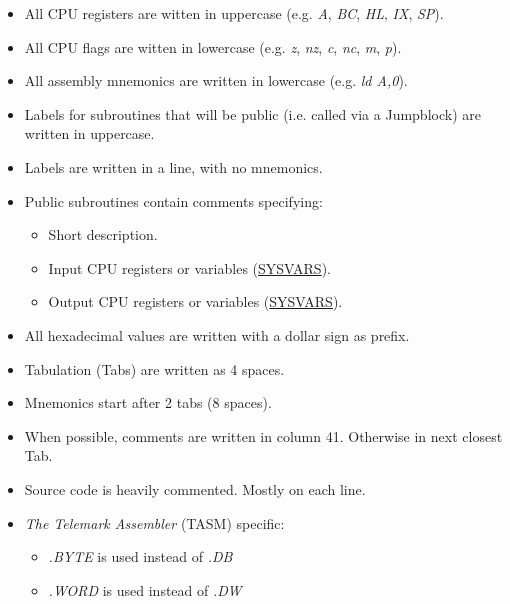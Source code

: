     \begin{itemize}
        \item All CPU registers are witten in uppercase (e.g. \textit{A},
        \textit{BC}, \textit{HL}, \textit{IX}, \textit{SP}).
        \item All CPU flags are witten in lowercase (e.g. \textit{z},
        \textit{nz}, \textit{c}, \textit{nc}, \textit{m}, \textit{p}).
        \item All assembly mnemonics are written in lowercase (e.g. 
        \textit{ld A,0}).
        \item Labels for subroutines that will be public (i.e. called via a
        Jumpblock) are written in uppercase.
        \item Labels are written in a line, with no mnemonics.
        \item Public subroutines contain comments specifying:
        \begin{itemize}
            \item Short description.
            \item Input CPU registers or variables (\hyperref[sec:ram_memmap]{SYSVARS}).
            \item Output CPU registers or variables (\hyperref[sec:ram_memmap]{SYSVARS}).
        \end{itemize}
        \item All hexadecimal values are written with a dollar sign as prefix.
        \item Tabulation (Tabs) are written as 4 spaces.
        \item Mnemonics start after 2 tabs (8 spaces).
        \item When possible, comments are written in column 41. Otherwise in
        next closest Tab.
        \item Source code is heavily commented. Mostly on each line.
        \item \textit{The Telemark Assembler} (TASM) specific:
        \begin{itemize}
            \item \textit{.BYTE} is used instead of \textit{.DB}
            \item \textit{.WORD} is used instead of \textit{.DW}
        \end{itemize}
    \end{itemize}